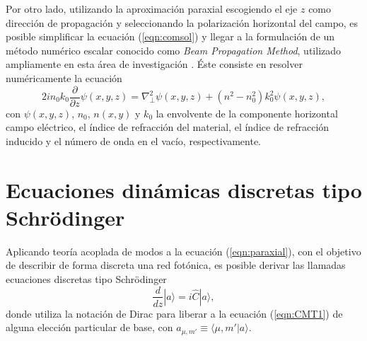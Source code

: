 Por otro lado, utilizando la aproximación paraxial escogiendo el eje $z$  como dirección de propagación y seleccionando la polarización horizontal del campo, es posible simplificar la ecuación (\ref{eqn:comsol}) y llegar a la formulación de un método numérico escalar conocido como \textit{Beam Propagation Method}, utilizado ampliamente en esta área de investigación \cite{bics, interorbital, OAMCaging, vortex, bpm}. Éste consiste en resolver numéricamente la ecuación
\begin{equation}
	2in_0k_0\frac{\partial}{\partial z}\psi(x,y,z) = \nabla_\perp^2 \psi (x,y,z) + \left(n^2-n_0^2\right)k_0^2 \psi (x,y,z), \label{eqn:paraxial}
\end{equation}
con $\psi(x,y,z)$, $n_0$, $n(x,y)$ y $k_0$ la envolvente de la componente horizontal campo eléctrico, el índice de refracción del material, el índice de refracción inducido y el número de onda en el vacío, respectivamente. 



\section{Ecuaciones dinámicas discretas tipo Schrödinger}

Aplicando teoría acoplada de modos \cite{coupledmodetheory} a la ecuación (\ref{eqn:paraxial}), con el objetivo de describir de forma discreta una red fotónica, es posible derivar las llamadas ecuaciones discretas tipo Schrödinger \cite{discretesolitons, artificialFB, FBdynamics}
\begin{equation}
	\frac{d }{d z} |a\rangle  = i\hat{C} |a\rangle, \label{eqn:CMT_mat}
\end{equation}
donde utiliza la notación de Dirac para liberar a la ecuación (\ref{eqn:CMT1}) de alguna elección particular de base, con $a_{\mu, m'} \equiv \langle \mu, m' | a \rangle$.
